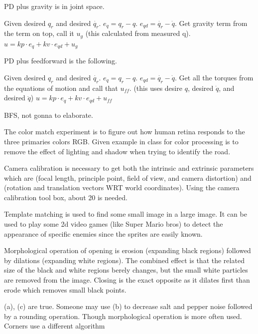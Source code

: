 \begin{solutionbox}[Q1-8]
    PD plus gravity is in joint space.

    Given desired $q_r$ and desired $\dot{q_r}$. $e_{q} = q_r-q$. $e_{qd} = \dot{q_r}-\dot{q}$. Get gravity term from the term on top, call it $u_g$ (this calculated from measured q). $u=kp\cdot e_q + kv\cdot e_{qd} + u_g$

    PD plus feedforward is the following.


    Given desired $q_r$ and desired $\dot{q_r}$. $e_{q} = q_r-q$. $e_{qd} = \dot{q_r}-\dot{q}$. Get all the torques from the equations of motion and call that $u_{ff}$. (this uses desire $q$, desired $\dot{q}$, and desired $\ddot{q}$) $u=kp\cdot e_q + kv\cdot e_{qd} + u_{ff}$
\end{solutionbox}

\begin{solutionbox}[Q1-9]
    BFS, not gonna to elaborate.
\end{solutionbox}

\begin{solutionbox}[Q1-10]
    The color match experiment is to figure out how human retina responds to the three primaries colors RGB. Given example in class for color processing is to remove the effect of lighting and shadow when trying to identify the road.

    \boxbar
    Camera calibration is necessary to get both the intrinsic and extrinsic parameters which are (focal length, principle point, field of view, and camera distortion) and (rotation and translation vectors WRT world coordinates). Using the camera calibration tool box, about 20 is needed.

    \boxbar
    Template matching is used to find some small image in a large image. It can be used to play some 2d video games (like Super Mario bros) to detect the appearance of specific enemies since the sprites are easily known.

    \boxbar
    Morphological operation of opening is erosion (expanding black regions) followed by dilations (expanding white regions). The combined effect is that the related size of the black and white regions berely changes, but the small white particles are removed from the image. Closing is the exact opposite as it dilates first than erode which removes small black points.

    \boxbar
    (a), (c) are true. Someone may use (b) to decrease salt and pepper noise followed by a rounding operation. Though morphological operation is more often used. Corners use a different algorithm
\end{solutionbox}
